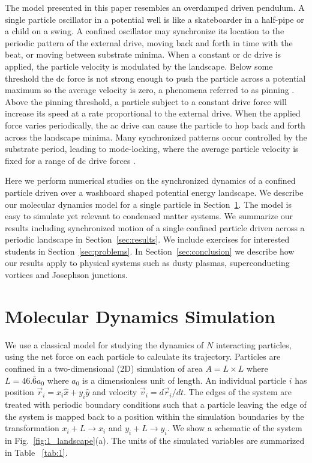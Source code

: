 \documentclass[twocolumn,showpacs,preprintnumbers,amsmath,amssymb,aps,prb]{revtex4}
\begin{document}
The model presented in this paper
resembles an overdamped driven pendulum.
A single particle oscillator
in a potential well is 
like a skateboarder in a half-pipe or
a child on a swing.
A confined oscillator may 
synchronize its location
to the periodic pattern of the external drive,
moving back and forth in time with
the beat,
or moving between substrate minima.
When 
a constant or 
dc drive is applied,
the particle velocity is modulated by 
the landscape.
Below some threshold  
the dc force is not strong enough to push the particle
across a potential maximum so the average velocity is zero,
a phenomena referred to as pinning \cite{Reichhardt2017}.
Above the pinning threshold,
a particle subject to a constant
drive force will increase its speed at a rate proportional
to the external drive.  
When the applied force varies periodically,
the ac drive can 
cause the particle to hop back and forth across
the landscape minima.
Many synchronized patterns occur
controlled by the substrate period,
leading to 
mode-locking,
where the average particle velocity
is fixed for a range of dc drive forces \cite{Reichhardt2015}.

Here we perform numerical studies 
on the synchronized dynamics
of a confined particle driven over
a washboard shaped potential energy landscape.
We describe
our molecular dynamics model for a single particle in Section~\ref{sec:MD}.
The model
is easy to simulate yet relevant
to condensed matter systems.
We summarize our results 
including synchronized motion of a single confined particle
driven across a periodic landscape in 
Section~\ref{sec:results}.
We include exercises for interested students 
in Section~\ref{sec:problems}.
In Section~\ref{sec:conclusion}
we describe how our results apply 
to physical systems
such as dusty plasmas, superconducting vortices and Josephson junctions.

\section{Molecular Dynamics Simulation}
\label{sec:MD}
We use a classical model for 
studying the dynamics of $N$ interacting particles,
using the net force on each particle to calculate
its trajectory.
Particles are confined in a two-dimensional (2D) 
simulation of area $A = L \times L$ where $L=46.\bar{6} a_0$
where $a_0$ is a dimensionless unit of length.
An individual particle $i$ has
position $\vec{r}_i = x_i \hat{x} + y_i \hat{y}$
and velocity $\vec{v}_i = d\vec{r}_i/dt$.
The edges of the system are treated with
periodic boundary conditions
such that a particle leaving the edge of the system is mapped
back to a position within the simulation boundaries 
by the transformation $x_i+L \rightarrow x_i$ and $y_i+L \rightarrow y_i$.
We show a schematic of the system in Fig.~\ref{fig:1_landscape}(a).
The units of the simulated variables are summarized in Table ~\ref{tab:1}.
\end{document}
